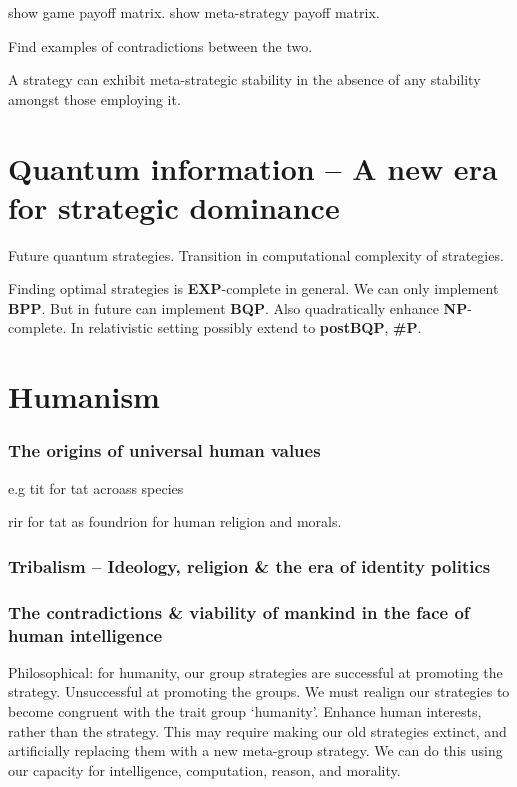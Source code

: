 \documentclass[twocolumn, aps, rmp, amsmath, amssymb, nofootinbib, superscriptaddress, longbibliography, floatfix, table-of-contents, eqsecnum]{revtex4-2}
\begin{document}
show game payoff matrix. show meta-strategy payoff matrix.

Find examples of contradictions between the two.

A strategy can exhibit meta-strategic stability in the absence of any stability amongst those employing it.

%
%

\part{Quantum information -- A new era for strategic dominance}

Future quantum strategies. Transition in computational complexity of strategies.

Finding optimal strategies is \textbf{EXP}-complete in general. We can only implement \textbf{BPP}. But in future can implement \textbf{BQP}. Also quadratically enhance \textbf{NP}-complete. In relativistic setting possibly extend to \textbf{postBQP}, \textbf{\#P}.

%
%

\part{Humanism}

\section{The origins of universal human values}

e.g tit for tat acroass species

rir for tat as foundrion for human religion and morals.

\section{Tribalism -- Ideology, religion \& the era of identity politics}

\section{The contradictions \& viability of mankind in the face of human intelligence}

Philosophical: for humanity, our group strategies are successful at promoting the strategy. Unsuccessful at promoting the groups. We must realign our strategies to become congruent with the trait group `humanity'. Enhance human interests, rather than the strategy. This may require making our old strategies extinct, and artificially replacing them with a new meta-group strategy. We can do this using our capacity for intelligence, computation, reason, and morality.
\end{document}
